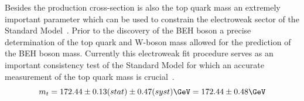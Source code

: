 Besides the production cross-section is also the top quark mass an extremely important parameter which can be used to constrain the electroweak sector of the Standard Model~\cite{ElectroweakFit}. %
Prior to the discovery of the BEH boson a precise determination of the top quark and W-boson mass allowed for the prediction of the BEH boson mass. Currently this electroweak fit procedure serves as an important consistency test of the Standard Model for which an accurate measurement of the top quark mass is crucial~\cite{CMSTopMass}.
\begin{equation}
 m_t = 172.44 \pm 0.13 (stat) \pm 0.47 (syst) \GeV = 172.44 \pm 0.48 \GeV
\end{equation}

